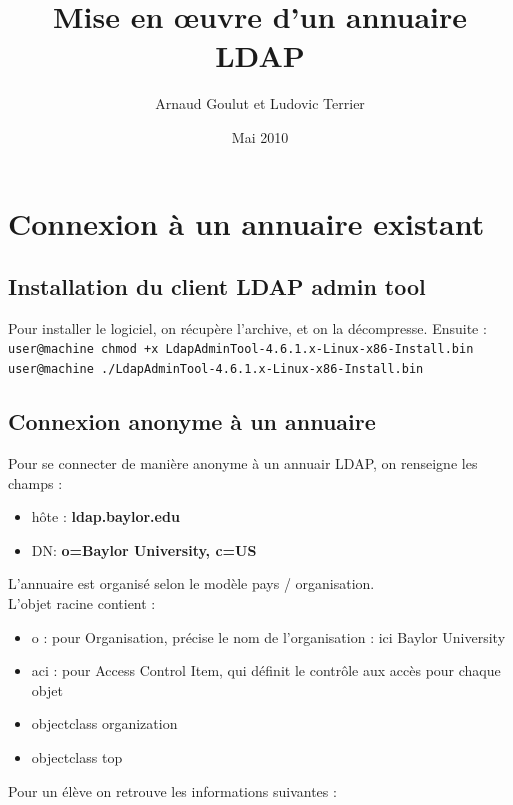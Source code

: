 \documentclass[12pt,a4paper,notitlepage]{article}
\begin{document}
\title{Mise en \oe uvre d'un annuaire LDAP}
\author{Arnaud Goulut et Ludovic Terrier}
\date{Mai 2010}
\maketitle



\thispagestyle{empty}




\section{Connexion à un annuaire existant}

\subsection{Installation du client LDAP admin tool}
Pour installer le logiciel, on récupère l'archive, et on la décompresse. Ensuite : \\

\noindent \texttt{user@machine  chmod +x LdapAdminTool-4.6.1.x-Linux-x86-Install.bin \\
user@machine  ./LdapAdminTool-4.6.1.x-Linux-x86-Install.bin}
\bigskip


\subsection{Connexion anonyme à un annuaire}
Pour se connecter de manière anonyme à un annuair LDAP, on renseigne les champs :

\begin{itemize}
\item hôte : \textbf{ldap.baylor.edu}
\item DN: \textbf{o=Baylor University, c=US}
\end{itemize}

\bigskip

L'annuaire est organisé selon le modèle pays / organisation. \\

L'objet racine contient :
\begin{itemize}
\item o : pour Organisation, précise le nom de l'organisation : ici Baylor University
\item aci : pour Access Control Item, qui définit le contrôle aux accès pour chaque objet
\item objectclass organization
\item objectclass top
\end{itemize}
\bigskip
Pour un élève on retrouve les informations suivantes :
\end{document}
